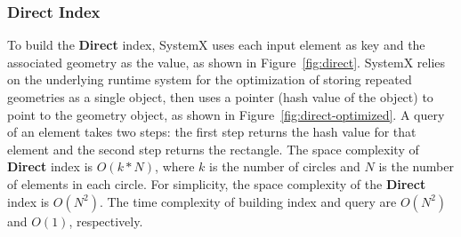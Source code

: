 \documentclass{sig-alternate}
\begin{document}
\subsubsection{Direct Index}
To build the {\bf Direct} index, SystemX uses each input element as key and the associated geometry as the value, as shown in Figure~\ref{fig:direct}.
SystemX relies on the underlying runtime system for the optimization of storing repeated geometries as a single object,
then uses a pointer (hash value of the object) to point to the geometry object, as shown in Figure~\ref{fig:direct-optimized}.
A query of an element takes two steps: the first step returns the hash value for that element and the second step returns the rectangle. 
The space complexity of {\bf Direct} index is $O(k*N)$, where $k$ is the number of circles and $N$ is the number of elements in each circle.
For simplicity, the space complexity of the {\bf Direct} index is $O(N^2)$.
The time complexity of building index and query are $O(N^2)$ and $O(1)$, respectively.
\end{document}
